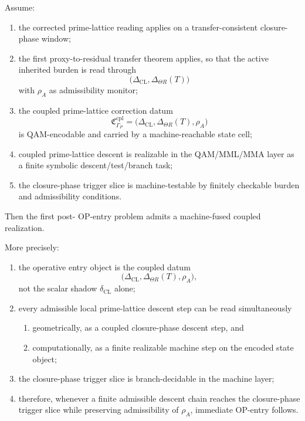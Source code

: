 \begin{theorem}
\label{thm:first-machine-fused-coupled-op-entry}
Assume:
\begin{enumerate}
 \item the corrected prime-lattice reading applies on a transfer-consistent closure-phase window;
 \item the first proxy-to-residual transfer theorem applies, so that the active inherited burden is read through
 \[
 \bigl(\Delta_{\mathrm{CL}},\Delta_{\Theta R}(T)\bigr)
 \]
 with $\rho_A$ as admissibility monitor;
 \item the coupled prime-lattice correction datum
 \[
 \mathfrak{C}_{\Gamma_P}^{\mathrm{cpl}}
 =
 \bigl(\Delta_{\mathrm{CL}},\Delta_{\Theta R}(T),\rho_A\bigr)
 \]
 is QAM-encodable and carried by a machine-reachable state cell;
 \item coupled prime-lattice descent is realizable in the QAM/MML/MMA layer as a finite symbolic descent/test/branch task;
 \item the closure-phase trigger slice is machine-testable by finitely checkable burden and admissibility conditions.
\end{enumerate}
Then the first post- OP-entry problem admits a machine-fused coupled realization.

More precisely:
\begin{enumerate}
 \item the operative entry object is the coupled datum
 \[
 \bigl(\Delta_{\mathrm{CL}},\Delta_{\Theta R}(T),\rho_A\bigr),
 \]
 not the scalar shadow $\delta_{\mathrm{CL}}$ alone;
 \item every admissible local prime-lattice descent step can be read simultaneously
 \begin{enumerate}
 \item geometrically, as a coupled closure-phase descent step, and
 \item computationally, as a finite realizable machine step on the encoded state object;
 \end{enumerate}
 \item the closure-phase trigger slice is branch-decidable in the machine layer;
 \item therefore, whenever a finite admissible descent chain reaches the closure-phase trigger slice while preserving admissibility of $\rho_A$, immediate OP-entry follows.
\end{enumerate}
\end{theorem}

